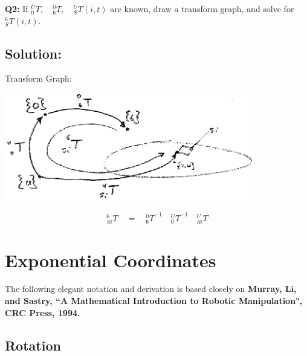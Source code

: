 \begin{ExampleCont}
{\bf Q2:}
If $^U_0T, \quad ^0_6T, \quad ^U_ST(i,t)$ are known, draw a transform graph, and solve
for $^6_ST(i,t)$.

\subsection*{Solution:}

Transform Graph:

\includegraphics[width=4.3in]{figs02/00443.eps}

\[
{^6_{Si}T} \quad = \quad {^0_6T}^{-1} \quad {^U_0T}^{-1}  \quad {^U_{Si}T}
\]

\end{ExampleCont}















%
%
%
%
%

\renewcommand\arraystretch{0.2}%


\section{Exponential Coordinates}

The following elegant notation and derivation is based closely on {\bf Murray, Li, and Sastry, ``A Mathematical Introduction to Robotic Manipulation", CRC Press, 1994.}

\subsection{Rotation}\label{Rotation}

